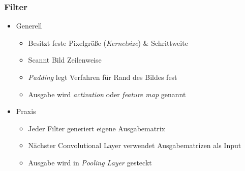 \begin{frame}
\frametitle{Filter}


\begin{itemize}
\item Generell

\begin{itemize}
	\item Besitzt feste Pixelgröße (\emph{Kernelsize}) \& Schrittweite
	\item Scannt Bild Zeilenweise
	\item \emph{Padding} legt Verfahren für Rand des Bildes fest
	\item Ausgabe wird \emph{activation} oder \emph{feature map} genannt
\end{itemize}

\item Praxis
\begin{itemize}
	\item Jeder Filter generiert eigene Ausgabematrix
	\item Nächster Convolutional Layer verwendet Ausgabematrizen als Input
	\item Ausgabe wird in \emph{Pooling Layer} gesteckt
\end{itemize}

\end{itemize}




\end{frame}



